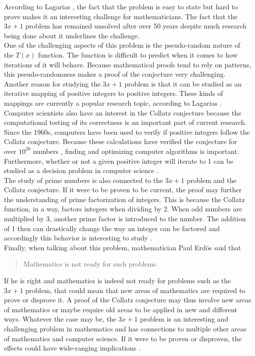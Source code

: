\documentclass[12pt,a4paper,reqno]{amsart}
\begin{document}
According to Lagarias \cite{src:03}, the fact that the problem is easy to state 
but hard to prove makes it an interesting challenge for mathematicians.
The fact that the $3x+1$ problem has remained unsolved after over 50 years
despite much research being done about it underlines the challenge. \\
One of the challenging aspects of this problem is the pseudo-random nature of 
the $T(x)$ function. The function is difficult to predict when it comes to how 
iterations of it will behave. Because mathematical proofs tend to rely on 
patterns, this pseudo-randomness makes a proof of the conjecture very
challenging. \\
Another reason for studying the $3x+1$ problem is that it can be studied as an 
iterative mapping of positive integers to positive integers. These kinds of
mappings are currently a popular research topic, according to Lagarias
\cite{src:03}. \\
Computer scientists also have an interest in the Collatz conjecture because 
the computational testing of its correctness is an important part of 
current research. Since the 1960s, computers have been used to verify if
positive integers follow the Collatz conjecture.
Because these calculations have verified the conjecture for over $10^{20}$ 
numbers \cite{src:04}, finding and optimizing computer algorithms is important. 
Furthermore, whether or not a given positive integer will iterate to 1 can be 
studied as a decision problem in computer science \cite{src:03}. \\
The study of prime numbers is also connected to the $3x+1$ problem and the
Collatz conjecture. If it were to be proven to be current, the proof may
further the understanding of prime factorization of integers. This is because 
the Collatz function, in a way, factors integers when dividing by 2. When odd 
numbers are multiplied by 3, another prime factor is introduced to the number.
The addition of 1 then can drastically change the way an integer can be
factored and accordingly this behavior is interesting to study \cite{src:03}.\\
Finally, when talking about this problem, mathematician Paul Erdös said that

\begin{quote}
Mathematics is not ready for such problems.
\end{quote}

If he is right and mathematics is indeed not ready for problems such as the
$3x+1$ problem, that could mean that new areas of mathematics are required to
prove or disprove it. A proof of the Collatz conjecture may thus involve new 
areas of mathematics or maybe require old areas to be applied in new and
different ways. Whatever the case may be, the $3x+1$ problem is an interesting
and challenging problem in mathematics and has connections to multiple other
areas of mathematics and computer science. If it were to be proven or
disproven, the effects could have wide-ranging implications \cite{src:03}.
\end{document}
